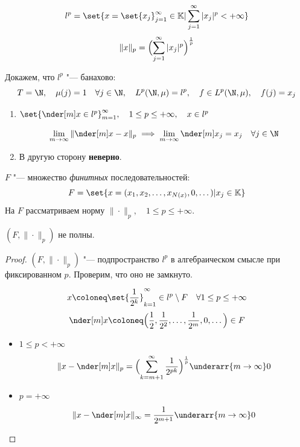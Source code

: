 \begin{definition}
	$$ l^p = \set{x = \set{x_j}_{j = 1}^\infty \in \mathbb K |
	\sum_{j = 1}^\infty |x_j|^p < +\infty} $$
	$$ \|x\|_p = \Bigl( \sum_{j = 1}^\infty |x_j|^p \Bigr)^{\frac1p} $$

	Докажем, что $ l^p $ "--- банахово:
	$$ T = \N, \quad \mu(j) = 1 \quad \forall j \in \N, \quad L^p(\N, \mu) = l^p, \quad f \in L^p(\N, \mu), \quad f(j) = x_j $$
\end{definition}

\begin{remark}
	\hfill
	\begin{enumerate}
		\item $ \set{\nder[m]x \in l^p}_{m = 1}^\infty, \quad
			1 \le p \le +\infty, \quad x \in l^p $

			$$ \lim\limits_{m \to \infty} \|\nder[m]x - x\|_p \implies
			\lim\limits_{m \to \infty}\nder[m]x_j = x_j \quad \forall j \in \N $$
		\item В другую сторону \textbf{неверно}.
	\end{enumerate}
\end{remark}

\begin{definition}
	$ F $ "--- множество \emph{финитных} последовательностей:
	$$ F = \set{x = (x_1, x_2, \dots, x_{N(x)}, 0, \dots) | x_j \in \mathbb K} $$
	На $ F $ рассматриваем норму $ \|\cdot\|_p, \quad 1 \le p \le +\infty $.
\end{definition}

\begin{statement}
	$ (F, \|\cdot\|_p) $ не полны.
\end{statement}

\begin{proof}
	$ (F, \|\cdot\|_p) $ "--- подпространство $ l^p $ в алгебраическом смысле при фиксированном
	$ p $.
	Проверим, что оно не замкнуто.

	$$ x \coloneq \set{\frac1{2^k}}_{k = 1}^\infty \in l^p \setminus F \quad \forall 1 \le p \le +\infty $$
	$$ \nder[m]x \coloneq \Bigl( \frac12, \frac1{2^2}, \dots, \frac1{2^m}, 0, \dots \Bigr) \in F $$
	\begin{itemize}
		\item $ 1 \le p < +\infty $
			$$ \|x - \nder[m]x\|_p = \Bigl( \sum_{k = m + 1}^\infty \frac1{2^{pk}} \Bigr)^{\frac1p} \underarr{m \to \infty} 0 $$
		\item $ p = +\infty $
			$$ \|x - \nder[m]x\|_\infty = \frac1{2^{m + 1}} \underarr{m \to \infty} 0 $$
	\end{itemize}
\end{proof}

